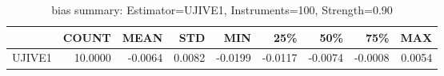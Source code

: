 \begin{table}[ht]
\centering
\caption{bias summary: Estimator=UJIVE1, Instruments=100, Strength=0.90}
\begin{tabular}{lrrrrrrrr}
\toprule
 & COUNT & MEAN & STD & MIN & 25\% & 50\% & 75\% & MAX \\
\midrule
UJIVE1 & 10.0000 & -0.0064 & 0.0082 & -0.0199 & -0.0117 & -0.0074 & -0.0008 & 0.0054 \\
\bottomrule
\end{tabular}
\end{table}
